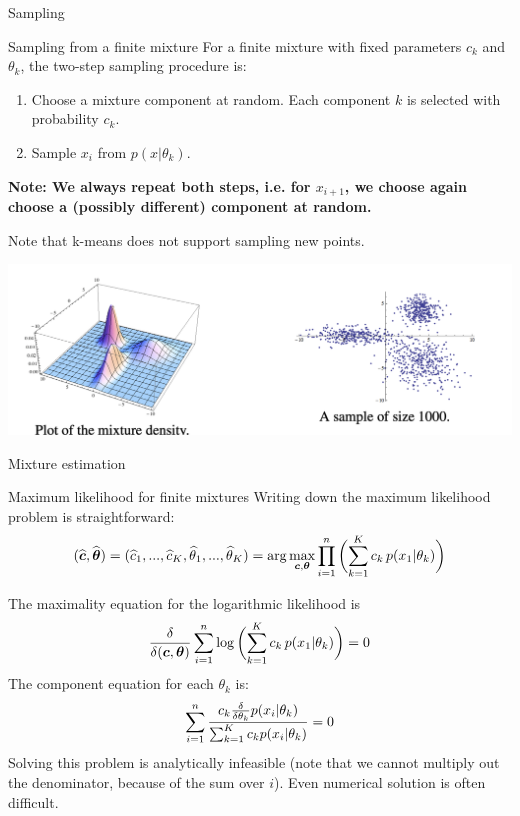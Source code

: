 \documentclass[10pt]{beamer}
\begin{document}
\begin{frame}{Sampling}
\scriptsize

\begin{sblock}{Sampling from a finite mixture}
For a finite mixture with fixed parameters $c_k$ and $\theta_k$, the two-step sampling procedure is:
\begin{enumerate}
\item Choose a mixture component at random. Each component $k$ is selected with probability $c_k$.
\item Sample $x_i$ from $p(x|\theta_k)$.
\end{enumerate}
\bf{Note}: We always repeat both steps, i.e. for $x_{i+1}$, we choose again choose a (possibly different) component at random.

\end{sblock}
\tiny \hfill Note that k-means does not support sampling new points.


\begin{center}
\includegraphics[width=\textwidth]{images/gmm_sampling}
\end{center} 


\end{frame}

\begin{frame}{Mixture estimation}
\footnotesize
\begin{sblock}{Maximum likelihood for finite mixtures}
Writing down the maximum likelihood problem is straightforward:
\[ (\widehat{{\boldsymbol c}}, \widehat{{\boldsymbol \theta}}) = (\widehat{c}_1, ..., \widehat{c}_K, \widehat{\theta}_1, ..., \widehat{\theta}_K) = \arg\max_{{\boldsymbol c}, {\boldsymbol \theta}} \displaystyle\prod_{i=1}^n  \bigg( { \displaystyle\sum_{k=1}^K c_k \, p(x_1 | \theta_k)} \bigg) \]

The maximality equation for the logarithmic likelihood is
\[ \displaystyle\frac{\delta}{\delta ({\boldsymbol c}, {\boldsymbol \theta}) } \displaystyle\sum_{i=1}^n \log \bigg( { \displaystyle\sum_{k=1}^K c_k \, p(x_1 | \theta_k)} \bigg)  = 0 \] 
The component equation for each $\theta_k$ is:
\[ \displaystyle\sum_{i=1}^n \displaystyle\frac{c_k \frac{\delta}{\delta \theta_k} p(x_i|\theta_k)}{\sum_{k=1}^K c_k p(x_i|\theta_k)}  =0 \] 
Solving this problem is analytically infeasible (note that we cannot multiply out the
denominator, because of the sum over $i$). Even numerical solution is often difficult.
\end{sblock}

\end{frame}
\end{document}
